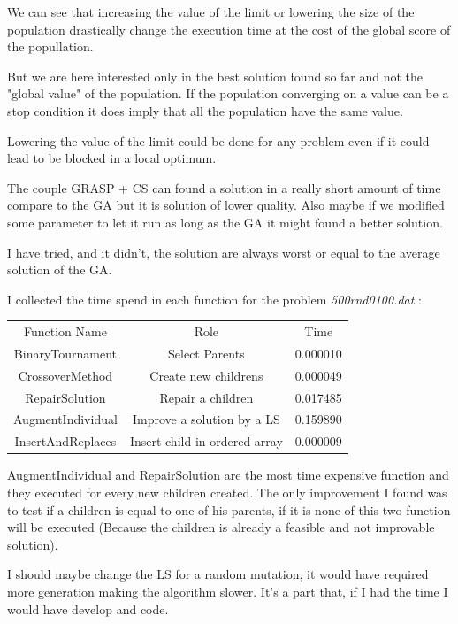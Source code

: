 \documentclass[12pt]{article}
\begin{document}
	We can see that increasing the value of the limit or lowering the size of the population drastically change the execution time at the cost of the global score of the popullation. 
	
	But we are here interested only in the best solution found so far and  not the "global value" of the population. 
	If the population converging on a value can be a stop condition it does imply that all the population have the same value.
	
	Lowering the value of the limit could be done for any problem even if it could lead to be blocked in a local optimum.
	
	The couple GRASP + CS can found a solution in a really short amount of time compare to the GA but it is solution of lower quality. Also maybe if we modified some parameter to let it run as long as the GA it might found a better solution.
	
	I have tried, and it didn't, the solution are always worst or equal to the average solution of the GA.
	
	I collected the time spend in each function for the problem \textit{500rnd0100.dat} :
	\begin{center}
		\begin{tabular}{|c|c|c|}
			Function Name & Role & Time \\
			BinaryTournament & Select Parents & 0.000010 \\
			CrossoverMethod & Create new childrens & 0.000049\\
			RepairSolution & Repair a children & 0.017485 \\
			AugmentIndividual & Improve a solution by a LS & 0.159890 \\
			InsertAndReplaces & Insert child in ordered array & 0.000009 \\
		\end{tabular}
	\end{center}
	AugmentIndividual and RepairSolution are the most time expensive function and they executed for every new children created.
	The only improvement I found was to test if a children is equal to one of his parents, if it is none of this two function will be executed (Because the children is already a feasible and not improvable solution).
	
	I should maybe change the LS for a random mutation, it would have required more generation making the algorithm slower. It's a part that, if I had the time I would have develop and code.
	\pagebreak
\end{document}
